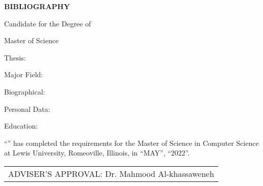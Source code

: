 \begin{center}
  \large
  \textbf{BIBLIOGRAPHY}  %
  
  
  \vspace{0.5cm}
  \textbf{\paperAuthor}

  \vspace{0.5cm}
  Candidate for the Degree of

  \vspace{0.5cm}
  Master of Science

\end{center}

\vspace{1cm}
Thesis: \MakeUppercase{\paperTitle}

\vspace{0.5cm}
Major Field: \authorConcentration

\vspace{0.5cm}
Biographical: 

\vspace{0.5cm}
Personal Data: 

\vspace{0.5cm}
Education: 

\vspace{0.5cm}
``\paperAuthor'' has completed the requirements for the Master of Science in Computer Science at Lewis University, Romeoville, Illinois, in ``MAY'', ``2022''.

\vspace{1cm}
\begin{tabular}{ p{} } 
  \hline
  ADVISER'S APPROVAL: Dr. Mahmood Al-khassaweneh \\ 
\end{tabular}
